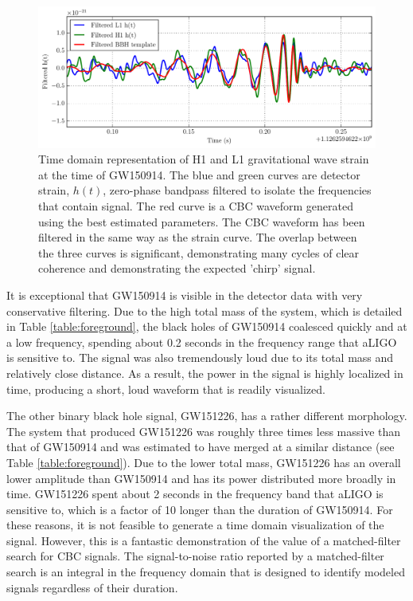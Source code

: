 \begin{figure}[ht!]
\includegraphics[width=\textwidth]{figures/O1/GW150914-timeseries}
\caption[GW150914 timeseries]{Time domain representation of H1 and L1 %
        gravitational wave strain at the time of GW150914. The blue %
        and green curves are detector strain, $h(t)$, zero-phase bandpass %
        filtered to isolate the %
        frequencies that contain signal. The red curve is a CBC waveform %
        generated using the best estimated parameters. The CBC waveform %
        has been filtered in the same way as the strain curve. The overlap %
        between the three curves is significant, demonstrating many cycles %
        of clear coherence and demonstrating the expected 'chirp' signal.}
\label{fig:GW150914}
\end{figure}

It is exceptional that GW150914 is visible in the detector data with 
very conservative filtering. Due to the high total mass of the system, 
which is detailed in Table \ref{table:foreground}, the black holes 
of GW150914 coalesced quickly and at a low frequency, spending about 
0.2 seconds in the frequency range that aLIGO is sensitive to. The 
signal was also tremendously loud due to its total mass and relatively 
close distance. 
As a result, the power in the signal is highly localized in time, 
producing a short, loud waveform that is readily visualized.

The other binary black hole signal, GW151226, has a rather different 
morphology. The system that produced GW151226 was roughly three times 
less massive than that of GW150914 and was estimated to have merged 
at a similar distance (see Table \ref{table:foreground}). Due to the 
lower total mass, GW151226 has an overall lower amplitude than GW150914 
and has its power distributed more broadly in time. GW151226 spent about 
2 seconds in the frequency band that aLIGO is sensitive to, which is a 
factor of 10 longer than the duration of GW150914. For these reasons, 
it is not feasible to generate a time domain visualization of the signal. 
However, this is a fantastic demonstration of the value of a 
matched-filter search for CBC signals. The signal-to-noise ratio 
reported by a matched-filter search is an 
integral in the frequency domain that is designed to identify modeled 
signals regardless of their duration.

